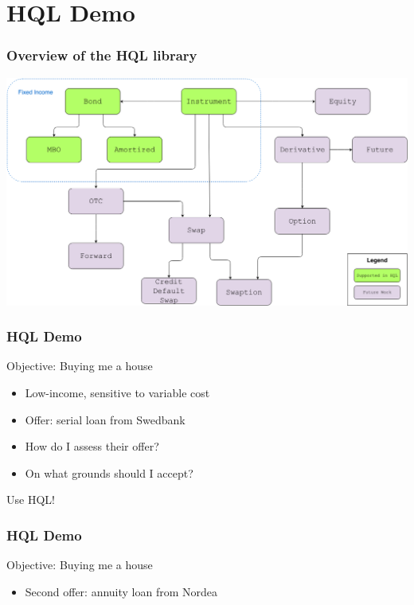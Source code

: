 \documentclass[]{beamer}
\begin{document}
\section{\textsc{HQL} Demo}
\begin{frame}
\frametitle{Overview of the \textsc{HQL} library}
        \includegraphics[scale=0.25]{images/classhier.png}
\end{frame}

\begin{frame}
\frametitle{\textsc{HQL} Demo}
    \begin{block}{Objective: Buying me a house}
      \begin{itemize}
        \item Low-income, sensitive to variable cost
        \item Offer: serial loan from Swedbank
        \item How do I assess their offer?
        \item On what grounds should I accept?
      \end{itemize}
    \end{block}
    \begin{center}
        Use \textsc{HQL}!
    \end{center}
\end{frame}


\begin{frame}
\frametitle{\textsc{HQL} Demo}
    \begin{block}{Objective: Buying me a house}
      \begin{itemize}
        \item Second offer: annuity loan from Nordea
      \end{itemize}
    \end{block}
\end{frame}
\end{document}
